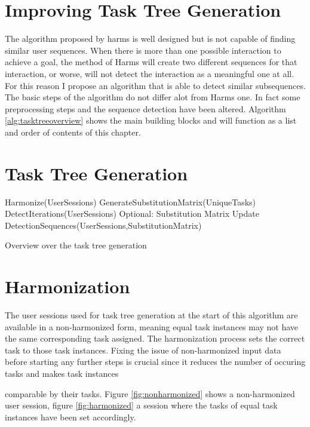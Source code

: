 \section{Improving Task Tree Generation}
The algorithm proposed by harms is well designed but is not capable of finding similar user sequences. 
When there is more than one possible interaction to achieve a goal, the method of Harms will create two different sequences for that interaction, 
or worse, will not detect the interaction as a meaningful one at all. For this reason I propose an algorithm that is able to detect similar subsequences.
The basic steps of the algorithm do not differ alot from Harms one. In fact some preprocessing steps and the sequence detection have been altered.
Algorithm \ref{alg:tasktreeoverview} shows the main building blocks and will function as a list and order of contents of this chapter.
\section{Task Tree Generation}

\begin{algorithm}[h]
\begin{algorithmic}
	\State Harmonize(UserSessions)
	\State GenerateSubstitutionMatrix(UniqueTasks)
	\State DetectIterations(UserSessions)
	\State Optional: Substitution Matrix Update
	\State DetectionSequences(UserSessions,SubstitutionMatrix)
	\EndWhile
	\EndProcedure
\end{algorithmic}
\caption{Overview over the task tree generation}
\label{alg:tasktreeoverview}
\end{algorithm}

\section{Harmonization}
The user sessions used for task tree generation at the start of this algorithm are available in a non-harmonized form, 
meaning equal task instances may not have the same corresponding task assigned. The harmonization process sets the correct task to those task instances.
Fixing the issue of non-harmonized input data before starting any further steps is crucial since it reduces the number of occuring tasks and makes task instances

comparable by their tasks. Figure \ref{fig:nonharmonized} shows a non-harmonized user session, figure \ref{fig:harmonized} a session where the tasks of equal task instances have been set accordingly.

